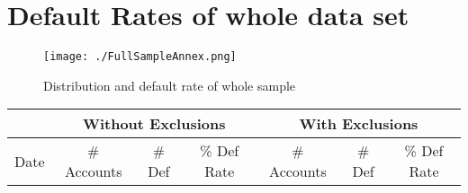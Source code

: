 \chapter{Default Rates of whole data set}
\label{sec:DR_whole}

\begin{figure}[H]
	\centering
	\texttt{[image: ./FullSampleAnnex.png]}
    \caption{Distribution and default rate of whole sample}
    \label{fig:an_wholesample}
\end{figure}

\begin{longtable}{r|rrr|rrr}\toprule
\multicolumn{1}{l}{}     & \multicolumn{3}{c}{Without Exclusions}                                                         & \multicolumn{3}{c}{With Exclusions}                                                            \\
\endfirsthead
%
\endhead
%
\multicolumn{1}{c}{Date} & \multicolumn{1}{c}{\# Accounts} & \multicolumn{1}{c}{\# Def} & \multicolumn{1}{c}{\% Def Rate} & \multicolumn{1}{c}{\# Accounts} & \multicolumn{1}{c}{\# Def} & \multicolumn{1}{c}{\% Def Rate} \\\midrule


\end{longtable}
